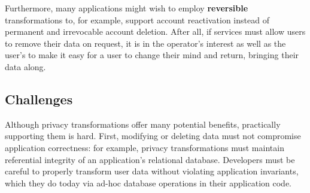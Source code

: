 Furthermore, many applications might wish to employ \textbf{reversible} transformations to, for
example, support account reactivation instead of permanent and irrevocable account deletion.
%
After all, if services must allow users to remove their data on request, it is in the operator's
interest as well as the user's to make it easy for a user to change their mind and return, bringing
their data along.



%

%
%

\subsection{Challenges}
%
Although privacy transformations offer many potential benefits, practically supporting them is hard.
First, modifying or deleting data must not compromise application correctness: for example, privacy
transformations must maintain referential integrity of an application's relational database.
Developers must be careful to properly transform user data without violating application invariants,
%
which they do today via ad-hoc database operations in their application code.

